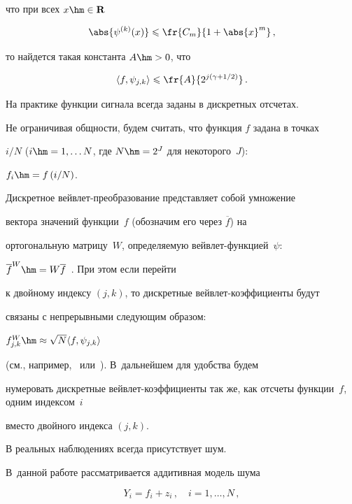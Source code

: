 что при всех $x\hm\in\mathbf{R}$

$$

\abs{\psi^{(k)}(x)}\leqslant\fr{C_m}{1+\abs{x}^m}\,,

$$

то найдется такая константа $A\hm>0$, что

\begin{equation}

\langle f,\psi_{j,k}\rangle\leqslant\fr{A}{2^{j\left(\gamma+1/2\right)}}\,.\label{e2sh}

\end{equation}



На практике функции сигнала всегда заданы в дискретных отсчетах. 

Не ограничивая общности, будем считать, что функция $f$ задана в точках 

${i}/{N}$ ($i\hm=1,\ldots N$, где $N\hm=2^J$ для некоторого~$J$): 

$f_i\hm=f\left({i}/{N}\right)$.

Дискретное вейв\-лет-пре\-обра\-зо\-ва\-ние представляет собой умножение 

вектора значений функции~$f$ (обозначим его через $\overline{f}$) на 

ортогональную матрицу~$W$, определяемую вейв\-лет-функ\-ци\-ей~$\psi$: 

$\overline{f}^{W}\hm=W\overline{f}$~\cite{11sh}. При этом если перейти 

к двойному индексу $(j,k)$, то дискретные вейв\-лет-ко\-эф\-фи\-ци\-ен\-ты будут 

связаны с непрерывными следующим образом: 

$f^{W}_{j,k}\hm\approx \sqrt{N}\langle f,\psi_{j,k}\rangle$ 

(см., например,~\cite{1sh} или~\cite{12sh}). В~дальнейшем для удобства будем 

нумеровать дискретные вейвлет-коэффициенты так же, как отсчеты функции~$f$, одним индексом~$i$ 

вмес\-то двойного индекса $(j,k)$.



В реальных наблюдениях всегда присутствует шум. 

В~данной работе рас\-смат\-ри\-ва\-ет\-ся аддитивная модель шума

$$

Y_i=f_i+z_i\,,\quad i=1,\ldots,N\,,

$$

